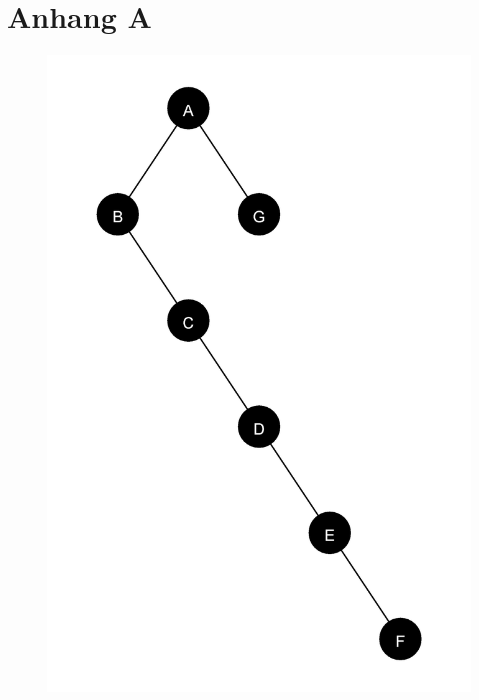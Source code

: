 \chapter{Anhang A}
\label{chap:anhang_a}

\begin{figure}[ht]
    \centering
    \begin{minipage}[t]{0.45\linewidth}
        \centering
        \includegraphics[scale = 0.06]{abbildungen/tree_spiegel_1_a2}
    \end{minipage}
    \hfill
    \begin{minipage}[t]{0.45\linewidth}
        \centering

\end{minipage}
\end{figure}
